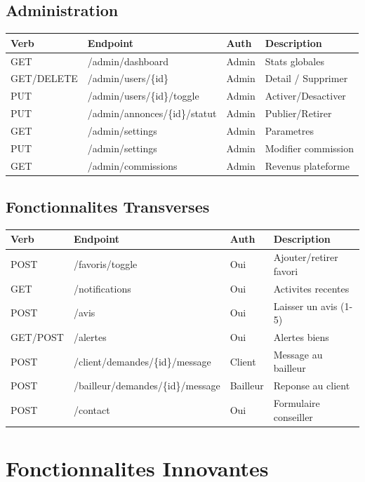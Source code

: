\documentclass[12pt,a4paper]{article}
\begin{document}
\subsection{Administration}
\begin{longtable}{|p{1.5cm}|p{6cm}|p{2cm}|p{3cm}|}
\hline
\textbf{Verb} & \textbf{Endpoint} & \textbf{Auth} & \textbf{Description} \\
\hline
\endhead
GET & /admin/dashboard & Admin & Stats globales \\
GET/DELETE & /admin/users/\{id\} & Admin & Detail / Supprimer \\
PUT & /admin/users/\{id\}/toggle & Admin & Activer/Desactiver \\
PUT & /admin/annonces/\{id\}/statut & Admin & Publier/Retirer \\
GET & /admin/settings & Admin & Parametres \\
PUT & /admin/settings & Admin & Modifier commission \\
GET & /admin/commissions & Admin & Revenus plateforme \\
\hline
\end{longtable}

\subsection{Fonctionnalites Transverses}
\begin{longtable}{|p{1.5cm}|p{6cm}|p{2cm}|p{3cm}|}
\hline
\textbf{Verb} & \textbf{Endpoint} & \textbf{Auth} & \textbf{Description} \\
\hline
\endhead
POST & /favoris/toggle & Oui & Ajouter/retirer favori \\
GET & /notifications & Oui & Activites recentes \\
POST & /avis & Oui & Laisser un avis (1-5) \\
GET/POST & /alertes & Oui & Alertes biens \\
POST & /client/demandes/\{id\}/message & Client & Message au bailleur \\
POST & /bailleur/demandes/\{id\}/message & Bailleur & Reponse au client \\
POST & /contact & Oui & Formulaire conseiller \\
\hline
\end{longtable}

\section{Fonctionnalites Innovantes}
\end{document}
